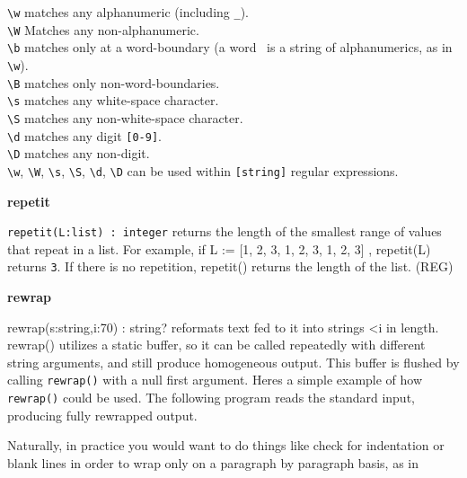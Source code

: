 \texttt{{\textbackslash}w} matches any alphanumeric (including
\texttt{{\textquotedbl}\_{\textquotedbl}}).\\
\texttt{{\textbackslash}W} Matches any non-alphanumeric.\\
\texttt{{\textbackslash}b} matches only at a word-boundary (a word \ is
a string of alphanumerics, as in \texttt{{\textbackslash}w}).\\
\texttt{{\textbackslash}B} matches only non-word-boundaries.\\
\texttt{{\textbackslash}s} matches any white-space character.\\
\texttt{{\textbackslash}S} matches any non-white-space
character.\\
\texttt{{\textbackslash}d} matches any digit \texttt{[0-9]}.\\
\texttt{{\textbackslash}D} matches any non-digit.\\
\texttt{{\textbackslash}w}, \texttt{{\textbackslash}W},
\texttt{{\textbackslash}s}, \texttt{{\textbackslash}S},
\texttt{{\textbackslash}d}, \texttt{{\textbackslash}D} can be used
within \texttt{[string]} regular expressions.

{\sffamily\bfseries
repetit}

\texttt{repetit(L:list) : integer} returns the length of the smallest
range of values that repeat in a list. For example, if L := [1, 2, 3,
1, 2, 3, 1, 2, 3] , \textsf{repetit(L)} returns \texttt{3}. If there is
no repetition, \textsf{repetit()} returns the length of the list. (REG)

{\sffamily\bfseries
rewrap}

\textsf{rewrap(s:string,i:70) : string?} reformats text fed to it into
strings \textsf{{\textless}i} in length. \textsf{rewrap()} utilizes a
static buffer, so it can be called repeatedly with different string
arguments, and still produce homogeneous output. This buffer is flushed
by calling \texttt{rewrap()} with a null first argument.
Here{\textquotesingle}s a simple example of how \texttt{rewrap()} could
be used. The following program reads the standard input, producing
fully rewrapped output.


Naturally, in practice you would want to do things like check for
indentation or blank lines in order to wrap only on a paragraph by
paragraph basis, as in

